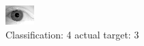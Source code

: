 \begin{figure}[h!]
\begin{center}
\includegraphics[width=0.60\columnwidth]{figures/ID2073_class_4_target_3.png}
\end{center}
\caption{ Classification: 4 actual target: 3}
\label{fig:ID2073_class_4_target_3}
\end{figure}
